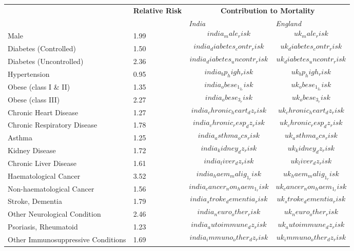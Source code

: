 \begin{tabular}{p{6cm}p{1.5cm}p{2cm}p{2cm}}
& \textbf{Relative \newline Risk} & \multicolumn{2}{c}{\textbf{Contribution to Mortality}} \\[-1.5ex]
& & \emph{India} & \emph{England} \\[2ex]
Male & 1.99 & $$india_male_risk$$ & $$uk_male_risk$$ \\[0.25ex]
Diabetes (Controlled) & 1.50 & $$india_diabetes_contr_risk$$ & $$uk_diabetes_contr_risk$$ \\[0.25ex]
Diabetes (Uncontrolled) & 2.36 & $$india_diabetes_uncontr_risk$$ & $$uk_diabetes_uncontr_risk$$ \\[0.25ex]
Hypertension & 0.95 & $$india_bp_high_risk$$ & $$uk_bp_high_risk$$ \\[0.25ex]
Obese (class I \& II) & 1.35 & $$india_obese_1_2_risk$$ & $$uk_obese_1_2_risk$$ \\[0.25ex]
Obese (class III) & 2.27 & $$india_obese_3_risk$$ & $$uk_obese_3_risk$$ \\[0.25ex]
Chronic Heart Disease & 1.27 & $$india_chronic_heart_dz_risk$$ & $$uk_chronic_heart_dz_risk$$ \\[0.25ex]
Chronic Respiratory Disease & 1.78 & $$india_chronic_resp_dz_risk$$ & $$uk_chronic_resp_dz_risk$$ \\[0.25ex]
Asthma & 1.25 & $$india_asthma_ocs_risk$$ & $$uk_asthma_ocs_risk$$ \\[0.25ex]
Kidney Disease & 1.72 & $$india_kidney_dz_risk$$ & $$uk_kidney_dz_risk$$ \\[0.25ex]
Chronic Liver Disease & 1.61 & $$india_liver_dz_risk$$ & $$uk_liver_dz_risk$$ \\[0.25ex]
Haematological Cancer & 3.52 & $$india_haem_malig_1_risk$$ & $$uk_haem_malig_1_risk$$ \\[0.25ex]
Non-haematological Cancer & 1.56 & $$india_cancer_non_haem_1_risk$$ & $$uk_cancer_non_haem_1_risk$$ \\[0.25ex]
Stroke, Dementia & 1.79 & $$india_stroke_dementia_risk$$ & $$uk_stroke_dementia_risk$$ \\[0.25ex]
Other Neurological Condition & 2.46 & $$india_neuro_other_risk$$ & $$uk_neuro_other_risk$$ \\[0.25ex]
Psoriasis, Rheumatoid & 1.23 & $$india_autoimmune_dz_risk$$ & $$uk_autoimmune_dz_risk$$ \\[0.25ex]
Other Immunosuppressive Conditions & 1.69 & $$india_immuno_other_dz_risk$$ & $$uk_immuno_other_dz_risk$$ \\[0.25ex]
\end{tabular}

